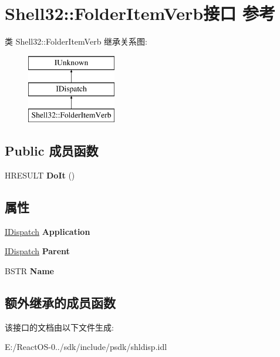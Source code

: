 \hypertarget{interface_shell32_1_1_folder_item_verb}{}\section{Shell32\+:\+:Folder\+Item\+Verb接口 参考}
\label{interface_shell32_1_1_folder_item_verb}
类 Shell32\+:\+:Folder\+Item\+Verb 继承关系图\+:\begin{figure}[H]
\begin{center}
\leavevmode
\includegraphics[height=3.000000cm]{interface_shell32_1_1_folder_item_verb}
\end{center}
\end{figure}
\subsection*{Public 成员函数}
\begin{DoxyCompactItemize}
\item 
\mbox{\label{interface_shell32_1_1_folder_item_verb_a30e293c2950125f4c80c60d993e8b326}} 
H\+R\+E\+S\+U\+LT {\bfseries Do\+It} ()
\end{DoxyCompactItemize}
\subsection*{属性}
\begin{DoxyCompactItemize}
\item 
\mbox{\label{interface_shell32_1_1_folder_item_verb_ae55433d82691a8ea6b66663d46ccd966}} 
\hyperlink{interface_i_dispatch}{I\+Dispatch} {\bfseries Application}
\item 
\mbox{\label{interface_shell32_1_1_folder_item_verb_a10b6b7f3bffa6c6a67aa512cf9aeba0c}} 
\hyperlink{interface_i_dispatch}{I\+Dispatch} {\bfseries Parent}
\item 
\mbox{\label{interface_shell32_1_1_folder_item_verb_ae2b4bfa7d6cf260f462dea88ed5fac88}} 
B\+S\+TR {\bfseries Name}
\end{DoxyCompactItemize}
\subsection*{额外继承的成员函数}


该接口的文档由以下文件生成\+:\begin{DoxyCompactItemize}
\item 
E\+:/\+React\+O\+S-\/0../sdk/include/psdk/shldisp.\+idl\end{DoxyCompactItemize}
